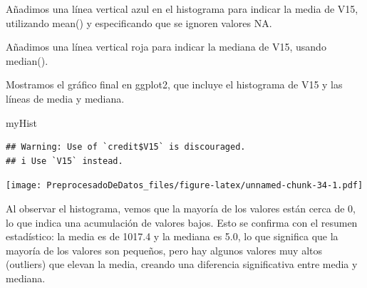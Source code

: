 \documentclass[
]{article}
\newenvironment{Shaded}{\begin{snugshade}}{\end{snugshade}}
\newcommand{\AttributeTok}[1]{\textcolor[rgb]{0.13,0.29,0.53}{#1}}
\newcommand{\ConstantTok}[1]{\textcolor[rgb]{0.56,0.35,0.01}{#1}}
\newcommand{\FunctionTok}[1]{\textcolor[rgb]{0.13,0.29,0.53}{\textbf{#1}}}
\newcommand{\NormalTok}[1]{#1}
\newcommand{\OtherTok}[1]{\textcolor[rgb]{0.56,0.35,0.01}{#1}}
\newcommand{\SpecialCharTok}[1]{\textcolor[rgb]{0.81,0.36,0.00}{\textbf{#1}}}
\newcommand{\StringTok}[1]{\textcolor[rgb]{0.31,0.60,0.02}{#1}}
\begin{document}
Añadimos una línea vertical azul en el histograma para indicar la media
de V15, utilizando mean() y especificando que se ignoren valores NA.

\begin{Shaded}
\end{Shaded}

Añadimos una línea vertical roja para indicar la mediana de V15, usando
median().

\begin{Shaded}
\end{Shaded}

Mostramos el gráfico final en ggplot2, que incluye el histograma de V15
y las líneas de media y mediana.

\begin{Shaded}
\begin{Highlighting}[]
\NormalTok{myHist}
\end{Highlighting}
\end{Shaded}

\begin{verbatim}
## Warning: Use of `credit$V15` is discouraged.
## i Use `V15` instead.
\end{verbatim}

\texttt{[image: PreprocesadoDeDatos\_files/figure-latex/unnamed-chunk-34-1.pdf]}

Al observar el histograma, vemos que la mayoría de los valores están
cerca de 0, lo que indica una acumulación de valores bajos. Esto se
confirma con el resumen estadístico: la media es de 1017.4 y la mediana
es 5.0, lo que significa que la mayoría de los valores son pequeños,
pero hay algunos valores muy altos (outliers) que elevan la media,
creando una diferencia significativa entre media y mediana.
\end{document}
